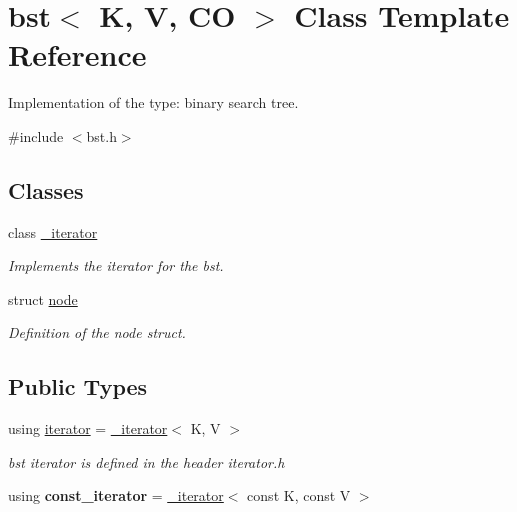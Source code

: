 \hypertarget{classbst}{}\section{bst$<$ K, V, CO $>$ Class Template Reference}
\label{classbst}


Implementation of the type\+: binary search tree.  




{\ttfamily \#include $<$bst.\+h$>$}

\subsection*{Classes}
\begin{DoxyCompactItemize}
\item 
class \hyperlink{classbst_1_1__iterator}{\+\_\+iterator}
\begin{DoxyCompactList}\small\item\em Implements the iterator for the bst. \end{DoxyCompactList}\item 
struct \hyperlink{structbst_1_1node}{node}
\begin{DoxyCompactList}\small\item\em Definition of the node struct. \end{DoxyCompactList}\end{DoxyCompactItemize}
\subsection*{Public Types}
\begin{DoxyCompactItemize}
\item 
using \hyperlink{classbst_a9378fa7f3f48ee62f3a0b4d168d8d98b}{iterator} = \hyperlink{classbst_1_1__iterator}{\+\_\+iterator}$<$ K, V $>$
\begin{DoxyCompactList}\small\item\em bst iterator is defined in the header iterator.\+h \end{DoxyCompactList}\item 
\mbox{\label{classbst_a915acf5718f8736a13d905450f9abcfc}} 
using {\bfseries const\+\_\+iterator} = \hyperlink{classbst_1_1__iterator}{\+\_\+iterator}$<$ const K, const V $>$
\end{DoxyCompactItemize}
